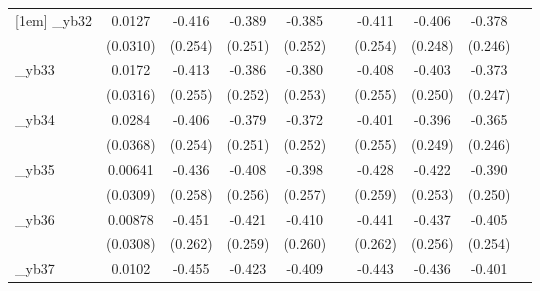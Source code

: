 \begin{table}[htbp]
\begin{tabular}{l*{9}{c}}
[1em]
\_yb32       &      0.0127         &      -0.416         &      -0.389         &      -0.385         &                     &      -0.411         &      -0.406         &      -0.378         &                     \\
            &    (0.0310)         &     (0.254)         &     (0.251)         &     (0.252)         &                     &     (0.254)         &     (0.248)         &     (0.246)         &                     \\
[1em]
\_yb33       &      0.0172         &      -0.413         &      -0.386         &      -0.380         &                     &      -0.408         &      -0.403         &      -0.373         &                     \\
            &    (0.0316)         &     (0.255)         &     (0.252)         &     (0.253)         &                     &     (0.255)         &     (0.250)         &     (0.247)         &                     \\
[1em]
\_yb34       &      0.0284         &      -0.406         &      -0.379         &      -0.372         &                     &      -0.401         &      -0.396         &      -0.365         &                     \\
            &    (0.0368)         &     (0.254)         &     (0.251)         &     (0.252)         &                     &     (0.255)         &     (0.249)         &     (0.246)         &                     \\
[1em]
\_yb35       &     0.00641         &      -0.436\sym{*}  &      -0.408         &      -0.398         &                     &      -0.428\sym{*}  &      -0.422\sym{*}  &      -0.390         &                     \\
            &    (0.0309)         &     (0.258)         &     (0.256)         &     (0.257)         &                     &     (0.259)         &     (0.253)         &     (0.250)         &                     \\
[1em]
\_yb36       &     0.00878         &      -0.451\sym{*}  &      -0.421         &      -0.410         &                     &      -0.441\sym{*}  &      -0.437\sym{*}  &      -0.405         &                     \\
            &    (0.0308)         &     (0.262)         &     (0.259)         &     (0.260)         &                     &     (0.262)         &     (0.256)         &     (0.254)         &                     \\
[1em]
\_yb37       &      0.0102         &      -0.455\sym{*}  &      -0.423         &      -0.409         &                     &      -0.443\sym{*}  &      -0.436\sym{*}  &      -0.401         &                     \\

\end{tabular}
\end{table}
